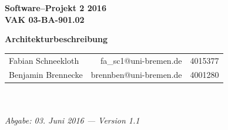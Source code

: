 \documentclass[fontsize=12pt,paper=a4,twoside]{scrartcl}
\begin{document}
  \thispagestyle{fancy}
  \fancyhead[LO,RE]{ }
  \fancyfoot[C]{}

  \vspace{3cm}

  \begin{minipage}[H]{\textwidth}
  \begin{center}
  \bfseries
  \Large
  Software--Projekt 2 2016\\
  \smallskip
  \small
  VAK 03-BA-901.02\\
  \vspace{3cm}
  \end{center}
  \end{minipage}
  \begin{minipage}[H]{\textwidth}
  \begin{center}
  \vspace{1cm}
  \bfseries
  \Large Architekturbeschreibung\\
  \vfill
  \end{center}
  \end{minipage}
  \vfill
  \begin{minipage}[H]{\textwidth}
  \begin{center}
  \sffamily
  \begin{tabular}{lrr}
  Fabian Schneekloth & fa\_sc1@uni-bremen.de & 4015377\\
  Benjamin Brennecke & brennben@uni-bremen.de & 4001280\\
  \end{tabular}
  \\ ~
  \vspace{2cm}
  \\
  \itshape Abgabe: 03. Juni 2016 --- Version 1.1\\ ~
  \end{center}
  \end{minipage}



\newpage

  \thispagestyle{fancy}
  \fancyhead{}
  \fancyfoot{}
  \renewcommand{\headrulewidth}{0.4pt}
  \tableofcontents
\end{document}
